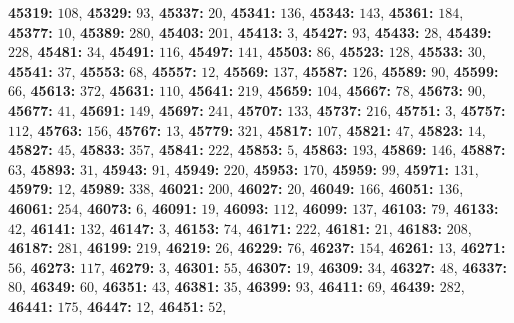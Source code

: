 \textsf{\bfseries 45319:} $108$, \textsf{\bfseries 45329:} $93$, \textsf{\bfseries 45337:} $20$, \textsf{\bfseries 45341:} $136$, \textsf{\bfseries 45343:} $143$, \textsf{\bfseries 45361:} $184$, \textsf{\bfseries 45377:} $10$, \textsf{\bfseries 45389:} $280$, \textsf{\bfseries 45403:} $201$, \textsf{\bfseries 45413:} $3$, \textsf{\bfseries 45427:} $93$, \textsf{\bfseries 45433:} $28$, \textsf{\bfseries 45439:} $228$, \textsf{\bfseries 45481:} $34$, \textsf{\bfseries 45491:} $116$, \textsf{\bfseries 45497:} $141$, \textsf{\bfseries 45503:} $86$, \textsf{\bfseries 45523:} $128$, \textsf{\bfseries 45533:} $30$, \textsf{\bfseries 45541:} $37$, \textsf{\bfseries 45553:} $68$, \textsf{\bfseries 45557:} $12$, \textsf{\bfseries 45569:} $137$, \textsf{\bfseries 45587:} $126$, \textsf{\bfseries 45589:} $90$, \textsf{\bfseries 45599:} $66$, \textsf{\bfseries 45613:} $372$, \textsf{\bfseries 45631:} $110$, \textsf{\bfseries 45641:} $219$, \textsf{\bfseries 45659:} $104$, \textsf{\bfseries 45667:} $78$, \textsf{\bfseries 45673:} $90$, \textsf{\bfseries 45677:} $41$, \textsf{\bfseries 45691:} $149$, \textsf{\bfseries 45697:} $241$, \textsf{\bfseries 45707:} $133$, \textsf{\bfseries 45737:} $216$, \textsf{\bfseries 45751:} $3$, \textsf{\bfseries 45757:} $112$, \textsf{\bfseries 45763:} $156$, \textsf{\bfseries 45767:} $13$, \textsf{\bfseries 45779:} $321$, \textsf{\bfseries 45817:} $107$, \textsf{\bfseries 45821:} $47$, \textsf{\bfseries 45823:} $14$, \textsf{\bfseries 45827:} $45$, \textsf{\bfseries 45833:} $357$, \textsf{\bfseries 45841:} $222$, \textsf{\bfseries 45853:} $5$, \textsf{\bfseries 45863:} $193$, \textsf{\bfseries 45869:} $146$, \textsf{\bfseries 45887:} $63$, \textsf{\bfseries 45893:} $31$, \textsf{\bfseries 45943:} $91$, \textsf{\bfseries 45949:} $220$, \textsf{\bfseries 45953:} $170$, \textsf{\bfseries 45959:} $99$, \textsf{\bfseries 45971:} $131$, \textsf{\bfseries 45979:} $12$, \textsf{\bfseries 45989:} $338$, \textsf{\bfseries 46021:} $200$, \textsf{\bfseries 46027:} $20$, \textsf{\bfseries 46049:} $166$, \textsf{\bfseries 46051:} $136$, \textsf{\bfseries 46061:} $254$, \textsf{\bfseries 46073:} $6$, \textsf{\bfseries 46091:} $19$, \textsf{\bfseries 46093:} $112$, \textsf{\bfseries 46099:} $137$, \textsf{\bfseries 46103:} $79$, \textsf{\bfseries 46133:} $42$, \textsf{\bfseries 46141:} $132$, \textsf{\bfseries 46147:} $3$, \textsf{\bfseries 46153:} $74$, \textsf{\bfseries 46171:} $222$, \textsf{\bfseries 46181:} $21$, \textsf{\bfseries 46183:} $208$, \textsf{\bfseries 46187:} $281$, \textsf{\bfseries 46199:} $219$, \textsf{\bfseries 46219:} $26$, \textsf{\bfseries 46229:} $76$, \textsf{\bfseries 46237:} $154$, \textsf{\bfseries 46261:} $13$, \textsf{\bfseries 46271:} $56$, \textsf{\bfseries 46273:} $117$, \textsf{\bfseries 46279:} $3$, \textsf{\bfseries 46301:} $55$, \textsf{\bfseries 46307:} $19$, \textsf{\bfseries 46309:} $34$, \textsf{\bfseries 46327:} $48$, \textsf{\bfseries 46337:} $80$, \textsf{\bfseries 46349:} $60$, \textsf{\bfseries 46351:} $43$, \textsf{\bfseries 46381:} $35$, \textsf{\bfseries 46399:} $93$, \textsf{\bfseries 46411:} $69$, \textsf{\bfseries 46439:} $282$, \textsf{\bfseries 46441:} $175$, \textsf{\bfseries 46447:} $12$, \textsf{\bfseries 46451:} $52$, 
